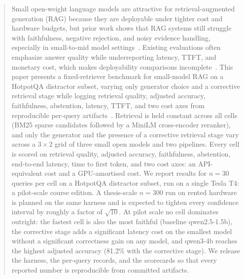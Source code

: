 
\begin{abstract}
Small open-weight language models are attractive for retrieval-augmented
generation (RAG) because they are deployable under tighter cost and
hardware budgets, but prior work shows that RAG systems still struggle
with faithfulness, negative rejection, and noisy evidence handling,
especially in small-to-mid model settings~\cite{mala2026faithfulness,chen2023rgb,zeng2025rare}.
Existing evaluations often emphasize answer quality while underreporting
latency, TTFT, and monetary cost, which makes deployability comparisons
incomplete~\cite{wu2024survey,brown2025systematic}. This paper presents
a fixed-retriever benchmark for small-model RAG on a HotpotQA distractor
subset, varying only generator choice and a corrective retrieval stage
while logging retrieval quality, adjusted accuracy, faithfulness,
abstention, latency, TTFT, and two cost axes from reproducible
per-query artifacts~\cite{mala2026faithfulness,es2023ragas,saadfalcon2023ares,elkiran2026empirical}.
Retrieval is held constant across all cells (BM25 sparse candidates
followed by a MiniLM cross-encoder reranker), and only the generator and
the presence of a corrective retrieval stage vary across a $3 \times 2$
grid of three small open models and two pipelines. Every cell is scored
on retrieval quality, adjusted accuracy, faithfulness, abstention,
end-to-end latency, time to first token, and two cost axes: an
API-equivalent cost and a GPU-amortised cost. We report results for
$n=30$ queries per cell on a HotpotQA distractor subset, run on a single
Tesla T4: a pilot-scale course edition. A thesis-scale $n=300$ run on
rented hardware is planned on the same harness and is expected to tighten
every confidence interval by roughly a factor of $\sqrt{10}$.
At pilot scale no cell dominates outright: the fastest cell is also the most
faithful (baseline qwen2.5-1.5b), the corrective stage adds a significant
latency cost on the smallest model without a significant correctness gain on
any model, and qwen3-4b reaches the highest adjusted accuracy (81.2\% with
the corrective stage).
We release the harness, the per-query records, and the scorecards so that
every reported number is reproducible from committed artifacts.

\end{abstract}
